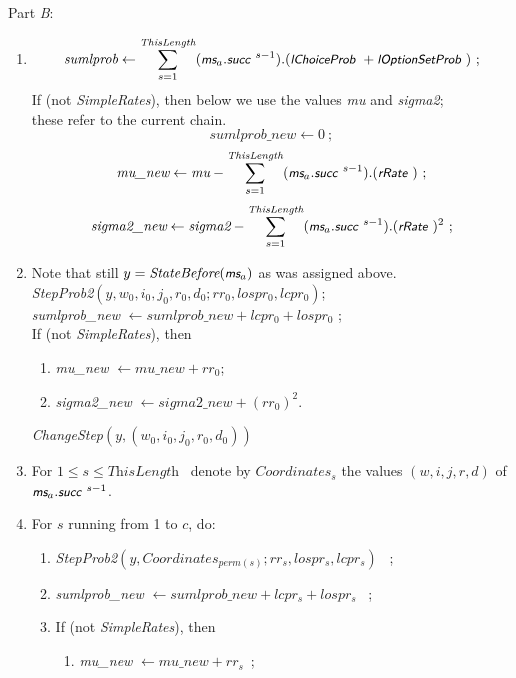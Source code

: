 \documentclass[a4paper,12pt,fleqn]{article}
\newcommand{\nnm}[1]{\textsf{\small\textit{#1}\ }}
\newcommand{\ms}{\textsl{\textsf{\small ms}}} %
\begin{document}
Part \emph{B}:
\begin{enumerate}[resume]
\item
\[ \textit{sumlprob} \leftarrow \sum_{s=1}^{\textit{ThisLength}}
             (\ms_a.\nnm{succ}^{s-1}).(\nnm{lChoiceProb} + \nnm{lOptionSetProb}) \ ;
      \]
      If (not \textit{SimpleRates}), then below we use
      the values \textit{mu} and \textit{sigma2}; \\
      these refer to the current chain.
\vspace*{-0.3em}
      \[
      \textit{sumlprob\_new}  \leftarrow 0 \ ;
      \]
      \[
      \textit{mu\_new}  \leftarrow \textit{mu} -  \sum_{s=1}^{\textit{ThisLength}}
             (\ms_a.\nnm{succ}^{s-1}).(\nnm{rRate}) \ ;
      \]
      \[
      \textit{sigma2\_new}  \leftarrow \textit{sigma2} -  \sum_{s=1}^{\textit{ThisLength}}
             (\ms_a.\nnm{succ}^{s-1}).(\nnm{rRate})^2 \ ;
      \]
\item Note that still $y =  \textit{StateBefore}(\ms_a)$ as was assigned above.\\
      \textit{StepProb2}$(y,w_0,i_0,j_0,r_0,d_0;  rr_0, lospr_0, lcpr_0)$;\\
        \textit{sumlprob\_new} $ \leftarrow \textit{sumlprob\_new} + lcpr_0 + lospr_0 $ ;\\
      If (not \textit{SimpleRates}), then
      \begin{enumerate}
      \item \textit{mu\_new} $ \leftarrow  \textit{mu\_new} + rr_0 $;
      \item \textit{sigma2\_new} $ \leftarrow \textit{sigma2\_new}  + (rr_0)^2  $.
      \end{enumerate}
      \textit{ChangeStep}$(y, (w_0,i_0,j_0,r_0,d_0))$
\item For $1 \leq s \leq \textit{ThisLength}$ \
      denote by $\textit{Coordinates}_s$ the values
      $(w,i,j,r,d)$ of $\ms_a.\nnm{succ}^{s-1}$.
\item For $s$ running from 1 to $c$, do:
      \begin{enumerate}
      \item \textit{StepProb2}$(y,
          \textit{Coordinates}_{\textit{perm}(s)}; rr_s, lospr_s, lcpr_s)$ \ ;
      \item  \textit{sumlprob\_new} $ \leftarrow
          \textit{sumlprob\_new} + lcpr_s + lospr_s $ \ ;
      \item If (not \textit{SimpleRates}), then
        \begin{enumerate}
        \item \textit{mu\_new} $ \leftarrow \textit{mu\_new} + rr_s $\ ;

\end{enumerate}
\end{enumerate}
\end{enumerate}
\end{document}
